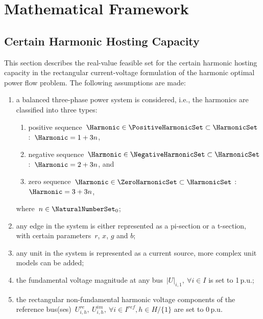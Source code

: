 \section{Mathematical Framework}
\label{sec:mathematical_framework}

\subsection{Certain Harmonic Hosting Capacity}
\label{sec:certain_harmonic_hosting_capacity}

This section describes the real-value feasible set for the certain harmonic hosting capacity in the rectangular current-voltage formulation of the harmonic optimal power flow problem. The following assumptions are made:
\begin{enumerate}
    \item a balanced three-phase power system is considered, i.e., the harmonics are classified into three types:
    \begin{enumerate}
        \item positive sequence~$\Harmonic \in \PositiveHarmonicSet \subset \HarmonicSet$:~$\Harmonic=1+3n$,
        \item negative sequence~$\Harmonic \in \NegativeHarmonicSet \subset \HarmonicSet$:~$\Harmonic=2+3n$, and
        \item zero sequence~$\Harmonic \in \ZeroHarmonicSet \subset \HarmonicSet$ :~$\Harmonic=3+3n$,
    \end{enumerate}
    where~$n \in \NaturalNumberSet_{0}$;
    \item any edge in the system is either represented as a pi-section or a t-section, with certain parameters~$r$, $x$, $g$ and $b$;
    \item any unit in the system is represented as a current source, more complex unit models can be added;
    \item the fundamental voltage magnitude at any bus~$|U|_{i,1},~\forall i \in I$ is set to 1\,p.u.;
    \item the rectangular non-fundamental harmonic voltage components of the reference bus(ses)~$U^{re}_{i,h},~U^{im}_{i,h},~\forall i \in I^{ref}, h \in H/\{1\}$ are set to 0\,p.u.
\end{enumerate}

